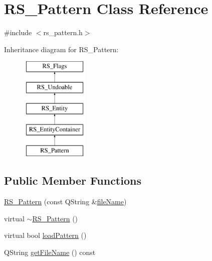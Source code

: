 \hypertarget{classRS__Pattern}{\section{R\-S\-\_\-\-Pattern Class Reference}
\label{classRS__Pattern}
}


{\ttfamily \#include $<$rs\-\_\-pattern.\-h$>$}

Inheritance diagram for R\-S\-\_\-\-Pattern\-:\begin{figure}[H]
\begin{center}
\leavevmode
\includegraphics[height=5.000000cm]{classRS__Pattern}
\end{center}
\end{figure}
\subsection*{Public Member Functions}
\begin{DoxyCompactItemize}
\item 
\hyperlink{classRS__Pattern_a6956073787aed31eb81b45dde4d54c9a}{R\-S\-\_\-\-Pattern} (const Q\-String \&\hyperlink{classRS__Pattern_a6ee67643c5f2d5f085aef19c59f2aa09}{file\-Name})
\item 
virtual \hyperlink{classRS__Pattern_aa410f90afcbc41e0395ec81112b126d4}{$\sim$\-R\-S\-\_\-\-Pattern} ()
\item 
virtual bool \hyperlink{classRS__Pattern_a528acfb300de6b8ed98262295ddd0deb}{load\-Pattern} ()
\item 
Q\-String \hyperlink{classRS__Pattern_aaeff147532943f474217d663ac9fc3e0}{get\-File\-Name} () const 
\end{DoxyCompactItemize}
